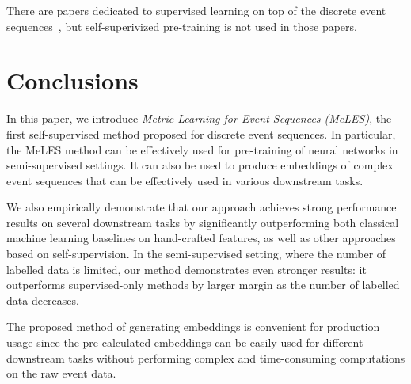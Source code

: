 \documentclass{article}
\begin{document}
There are papers dedicated to supervised learning on top of the discrete event sequences~\cite{Babaev2019ETRNNAD}, but self-superivized pre-training is not used in those papers.

\section{Conclusions} \label{sec-conclusions}

In this paper, we introduce \emph{Metric Learning for Event Sequences (MeLES)}, the first self-supervised method proposed for discrete event sequences.
In particular, the MeLES method can be effectively used for pre-training of neural networks in semi-supervised settings. It can also be used to produce embeddings of complex event sequences that can be effectively used in various downstream tasks.

We also empirically demonstrate that our approach achieves strong performance results on several downstream tasks by significantly outperforming both classical machine learning baselines on hand-crafted features, as well as other approaches based on self-supervision.
In the semi-supervised setting, where the number of labelled data is limited, our method demonstrates even stronger results: it outperforms supervised-only methods by larger margin as the number of labelled data decreases.

The proposed method of generating embeddings is convenient for production usage since the pre-calculated embeddings can be easily used for different downstream tasks without performing complex and time-consuming computations on the raw event data.


\end{document}
